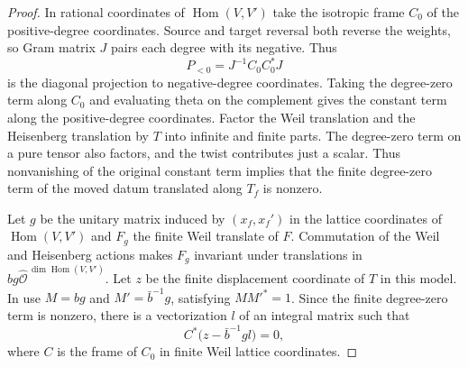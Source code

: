 \begin{proof}
In rational coordinates of $\operatorname{Hom}(V,V')$ take the isotropic frame $C_0$ of the positive-degree coordinates. Source and target reversal both reverse the weights, so Gram matrix $J$ pairs each degree with its negative. Thus
\[
 P_{<0}=J^{-1}C_0C_0^\ast J
\]
is the diagonal projection to negative-degree coordinates. Taking the degree-zero term along $C_0$ and evaluating theta on the complement gives the constant term along the positive-degree coordinates. Factor the Weil translation and the Heisenberg translation by $T$ into infinite and finite parts. The degree-zero term on a pure tensor also factors, and the twist contributes just a scalar. Thus nonvanishing of the original constant term implies that the finite degree-zero term of the moved datum translated along $T_f$ is nonzero.

Let $g$ be the unitary matrix induced by $(x_f,x_f')$ in the lattice coordinates of $\operatorname{Hom}(V,V')$ and $F_g$ the finite Weil translate of $F$. Commutation of the Weil and Heisenberg actions makes $F_g$ invariant under translations in $bg\widehat{\mathcal O}^{\,\dim\operatorname{Hom}(V,V')}$. Let $z$ be the finite displacement coordinate of $T$ in this model. In  use $M=bg$ and $M'=\bar b^{-1}g$, satisfying $MM'^\ast=1$. Since the finite degree-zero term is nonzero, there is a vectorization $l$ of an integral matrix such that
\[
 C^\ast\bigl(z-\bar b^{-1} g l\bigr)=0,
\]
where $C$ is the frame of $C_0$ in finite Weil lattice coordinates.


\end{proof}

